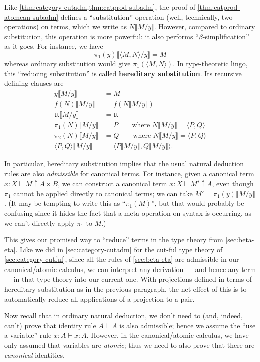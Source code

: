 \documentclass{book}
\let\types\vdash
\newcommand{\can}{\mathrel{\uparrow}}
\newcommand{\hsub}[1]{\llbracket #1\rrbracket}
\def\ttt{\mathsf{tt}}
\def\pair#1#2{\langle #1,#2\rangle}
\begin{document}
Like \cref{thm:category-cutadm,thm:catprod-subadm}, the proof of \cref{thm:catprod-atomcan-subadm} defines a ``substitution'' operation (well, technically, two operations) on terms, which we write as $N\hsub{M/y}$.
However, compared to ordinary substitution, this operation is more powerful: it also performs ``$\beta$-simplification'' as it goes.
For instance, we have
\[ \pi_1(y)\hsub{\pair M N/y} = M \]
whereas ordinary substitution would give $\pi_1(\pair M N)$.
In type-theoretic lingo, this ``reducing substitution'' is called \textbf{hereditary substitution}.
Its recursive defining clauses are
\begin{align*}
  y\hsub{M/y} &= M\\
  f(N)\hsub{M/y} &= f(N\hsub{M/y})\\
  \ttt\hsub{M/y} &= \ttt\\
  \pi_1(N)\hsub{M/y} &= P \qquad\text{where }N\hsub{M/y}=\pair P Q\\
  \pi_2(N)\hsub{M/y} &= Q \qquad\text{where }N\hsub{M/y}=\pair P Q\\
  \pair P Q \hsub{M/y} &= \pair{P\hsub{M/y}}{Q\hsub{M/y}}.
\end{align*}

In particular, hereditary substitution implies that the usual natural deduction rules are also \emph{admissible} for canonical terms.
For instance, given a canonical term $x:X \types M\can A\times B$, we can construct a canonical term $x:X\types M' \can A$, even though $\pi_1$ cannot be applied directly to canonical terms; we can take $M' = \pi_1(y)\hsub{M/y}$.
(It may be tempting to write this as ``$\pi_1(M)$'', but that would probably be confusing since it hides the fact that a meta-operation on syntax is occurring, as we can't directly apply $\pi_1$ to $M$.)

This gives our promised way to ``reduce'' terms in the type theory from \cref{sec:beta-eta}.
Like we did in \cref{sec:category-cutadm} for the cut-ful type theory of \cref{sec:category-cutful}, since all the rules of \cref{sec:beta-eta} are admissible in our canonical/atomic calculus, we can interpret any derivation --- and hence any term --- in that type theory into our current one.
With projections defined in terms of hereditary substitution as in the previous paragraph, the net effect of this is to automatically reduce all applications of a projection to a pair.

Now recall that in ordinary natural deduction, we don't need to (and, indeed, can't) prove that identity rule $A\types A$ is also admissible; hence we assume the ``use a variable'' rule $x:A\types x:A$.
However, in the canonical/atomic calculus, we have only assumed that variables are \emph{atomic}; thus we need to also prove that there are \emph{canonical} identities.
\end{document}
